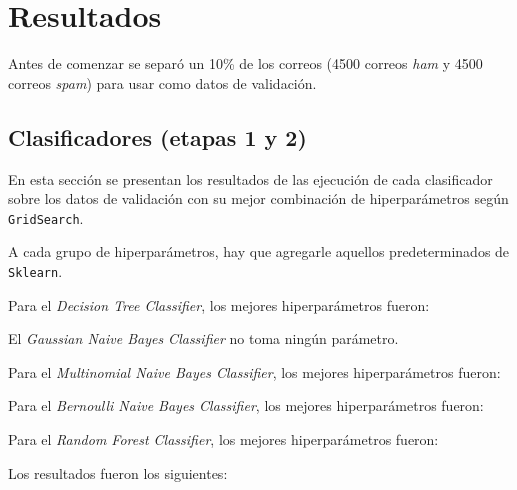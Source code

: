 \section{Resultados}

Antes de comenzar se separó un 10\% de los correos (4500 correos \emph{ham} y 4500 correos \emph{spam}) para usar como datos de validación.

\subsection{Clasificadores (etapas 1 y 2)}

En esta sección se presentan los resultados de las ejecuci\'on de cada clasificador sobre los datos de validaci\'on con su mejor combinación de hiperparámetros según \texttt{GridSearch}.

A cada grupo de hiperpar\'ametros, hay que agregarle aquellos predeterminados de \texttt{Sklearn}.

Para el \emph{Decision Tree Classifier}, los mejores hiperpar\'ametros fueron:
\begin{itemize}
\end{itemize}

El \emph{Gaussian Naive Bayes Classifier} no toma ning\'un par\'ametro.

Para el \emph{Multinomial Naive Bayes Classifier}, los mejores hiperpar\'ametros fueron:
\begin{itemize}
\end{itemize}

Para el \emph{Bernoulli Naive Bayes Classifier}, los mejores hiperpar\'ametros fueron:
\begin{itemize}
\end{itemize}

Para el \emph{Random Forest Classifier}, los mejores hiperpar\'ametros fueron:
\begin{itemize}
\end{itemize}

Los resultados fueron los siguientes:

